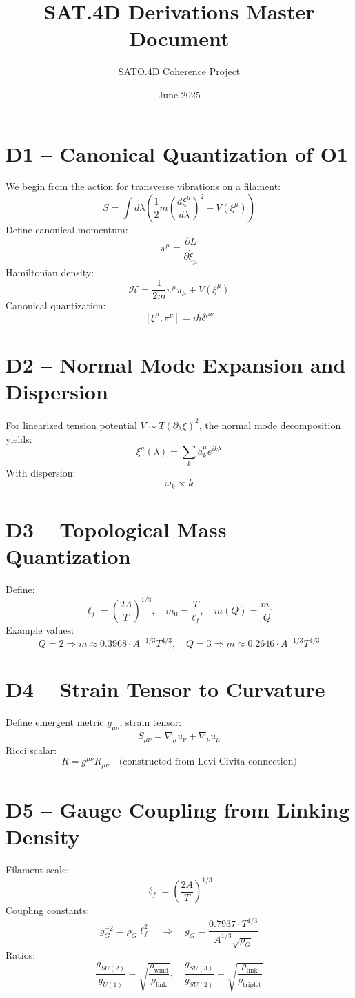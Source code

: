 \documentclass[12pt]{article}
\title{SAT.4D Derivations Master Document}
\author{SATO.4D Coherence Project}
\date{June 2025}
\begin{document}
\maketitle

\section*{D1 – Canonical Quantization of O1}
We begin from the action for transverse vibrations on a filament:
\[
S = \int d\lambda \left( \frac{1}{2} m \left( \frac{d\xi^\mu}{d\lambda} \right)^2 - V(\xi^\mu) \right)
\]
Define canonical momentum:
\[
\pi^\mu = \frac{\partial L}{\partial \dot{\xi}_\mu}
\]
Hamiltonian density:
\[
\mathcal{H} = \frac{1}{2m} \pi^\mu \pi_\mu + V(\xi^\mu)
\]
Canonical quantization:
\[
[\xi^\mu, \pi^\nu] = i \hbar \delta^{\mu\nu}
\]

\section*{D2 – Normal Mode Expansion and Dispersion}
For linearized tension potential \( V \sim T (\partial_\lambda \xi)^2 \), the normal mode decomposition yields:
\[
\xi^\mu(\lambda) = \sum_k a_k^\mu e^{ik\lambda}
\]
With dispersion:
\[
\omega_k \propto k
\]

\section*{D3 – Topological Mass Quantization}
Define:
\[
\ell_f = \left( \frac{2A}{T} \right)^{1/3}, \quad m_0 = \frac{T}{\ell_f}, \quad m(Q) = \frac{m_0}{Q}
\]
Example values:
\[
Q = 2 \Rightarrow m \approx 0.3968 \cdot A^{-1/3} T^{4/3}, \quad Q = 3 \Rightarrow m \approx 0.2646 \cdot A^{-1/3} T^{4/3}
\]

\section*{D4 – Strain Tensor to Curvature}
Define emergent metric \( g_{\mu\nu} \), strain tensor:
\[
S_{\mu\nu} = \nabla_\mu u_\nu + \nabla_\nu u_\mu
\]
Ricci scalar:
\[
R = g^{\mu\nu} R_{\mu\nu} \quad \text{(constructed from Levi-Civita connection)}
\]

\section*{D5 – Gauge Coupling from Linking Density}
Filament scale:
\[
\ell_f = \left( \frac{2A}{T} \right)^{1/3}
\]
Coupling constants:
\[
g_G^{-2} = \rho_G \ell_f^2 \quad \Rightarrow \quad g_G = \frac{0.7937 \cdot T^{1/3}}{A^{1/3} \sqrt{\rho_G}}
\]
Ratios:
\[
\frac{g_{SU(2)}}{g_{U(1)}} = \sqrt{\frac{\rho_{\text{wind}}}{\rho_{\text{link}}}}, \quad
\frac{g_{SU(3)}}{g_{SU(2)}} = \sqrt{\frac{\rho_{\text{link}}}{\rho_{\text{triplet}}}}
\]
\end{document}
